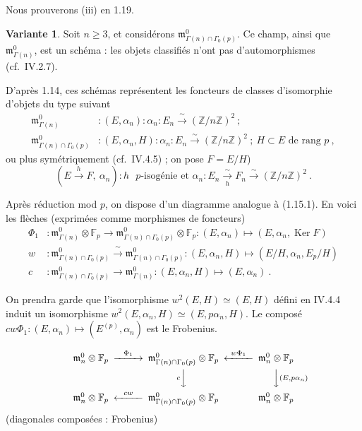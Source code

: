 \documentclass[10pt,a4paper]{amsart}
\theoremstyle{plain}
\theoremstyle{definition}
\newtheorem{variante}[theorem]{Variante}
\DeclareMathOperator{\Ker}{Ker}
\newcommand{\m}{\mathfrak{m}}
\newcommand{\FF}{\mathbb{F}}
\newcommand{\ZZ}{\mathbb{Z}}
\begin{document}
Nous prouverons (iii) en 1.19.

\setcounter{theorem}{16}
\begin{variante}
Soit $n \geq 3$, et consid\'erons $\m_{\Gamma(n) \cap \Gamma_0(p)}^0$. Ce champ, ainsi que $\m_{\Gamma(n)}^0$, est un sch\'ema : les objets classifi\'es n'ont pas d'automorphismes (cf.\ IV.2.7).

D'apr\`es 1.14, ces sch\'emas repr\'esentent les foncteurs de classes d'isomorphie d'objets du type suivant
\begin{align*}
\m_{\Gamma(n)}^0 &: (E,\alpha_n) : \alpha_n : E_n \xrightarrow{\;\sim\;} (\ZZ/n\ZZ)^2\ ;\\
\m_{\Gamma(n) \cap \Gamma_0(p)}^0 &: (E,\alpha_n,H) : \alpha_n : E_n \xrightarrow{\;\sim\;} (\ZZ/n\ZZ)^2\ ;\ H \subset E \text{ de rang } p\ ,
\end{align*}
ou plus sym\'etriquement (cf.\ IV.4.5) ; on pose $F = E/H$)
\[
(E \xrightarrow{h} F,\ \alpha_n) : h \text{ $p$-isog\'enie et } \alpha_n : E_n \xrightarrow[h]{\sim} F_n \xrightarrow{\sim} (\ZZ/n\ZZ)^2\ .
\]

Apr\`es r\'eduction mod $p$, on dispose d'un diagramme analogue \`a (1.15.1). En voici les fl\`eches (exprim\'ees comme morphismes de foncteurs)
\begin{align*}
\Phi_1 &: \m_{\Gamma(n)}^0 \otimes \FF_p \to \m_{\Gamma(n) \cap \Gamma_0(p)}^0 \otimes \FF_p : (E,\alpha_n) \mapsto (E,\alpha_n,\Ker F)\\
w &: \m_{\Gamma(n) \cap \Gamma_0(p)}^0 \xrightarrow{\;\sim\;} \m_{\Gamma(n) \cap \Gamma_0(p)}^0 : (E,\alpha_n,H) \mapsto (E/H,\alpha_n,E_p/H)\\
c &: \m_{\Gamma(n) \cap \Gamma_0(p)}^0 \to \m_{\Gamma(n)}^0 : (E,\alpha_n,H) \mapsto (E,\alpha_n)\ .
\end{align*}

On prendra garde que l'isomorphisme $w^2(E,H) \simeq (E,H)$ d\'efini en IV.4.4 induit un isomorphisme $w^2(E,\alpha_n,H) \simeq (E,p\alpha_n,H)$. Le compos\'e $cw\Phi_1 : (E,\alpha_n) \mapsto (E^{(p)},\alpha_n)$ est le Frobenius.
\end{variante}

\[
\begin{CD}
\m_n^0 \otimes \FF_p @>{\Phi_1}>> \m_{\Gamma(n) \cap \Gamma_0(p)}^0 \otimes \FF_p @<{w\Phi_1}<< \m_n^0 \otimes \FF_p \\
@. @V{c}VV @VV{(E,p\alpha_n)}V \\
\m_n^0 \otimes \FF_p @<{cw}<< \m_{\Gamma(n) \cap \Gamma_0(p)}^0 \otimes \FF_p @. \m_n^0 \otimes \FF_p
\end{CD}
\]
(diagonales compos\'ees : Frobenius)
\end{document}

